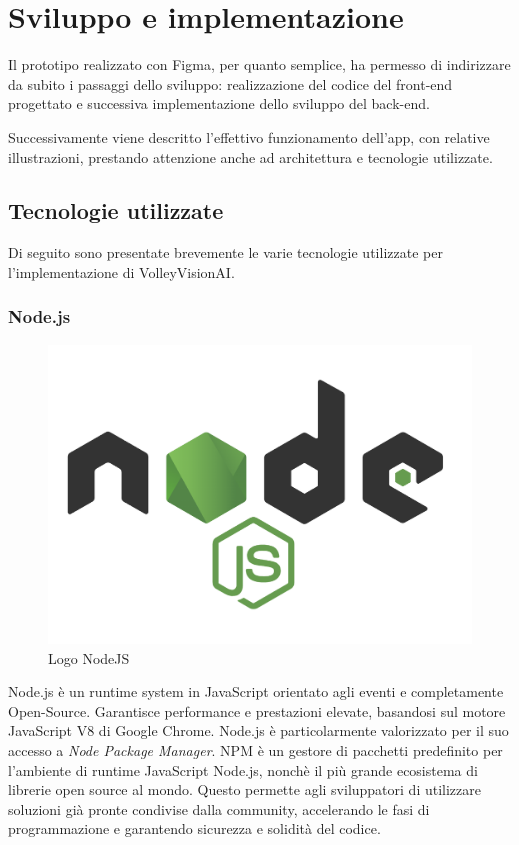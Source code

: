 \chapter{Sviluppo e implementazione}
\label{cha:sviluppo_implementazione}

Il prototipo realizzato con Figma, per quanto semplice, ha permesso di indirizzare da subito i passaggi dello sviluppo: realizzazione del codice del front-end progettato e successiva implementazione dello sviluppo del back-end.

Successivamente viene descritto l'effettivo funzionamento dell'app, con relative illustrazioni, prestando attenzione anche ad architettura e tecnologie utilizzate.

\section{Tecnologie utilizzate}
\label{sec:tecnologie}

Di seguito sono presentate brevemente le varie tecnologie utilizzate per l'implementazione di VolleyVisionAI.


\subsection{Node.js}
\begin{figure}
    \centering
    \includegraphics[scale=0.17]{img/nodejs.png}
    \caption{Logo NodeJS}
\end{figure}
    
Node.js è un runtime system in JavaScript orientato agli eventi e completamente Open-Source. Garantisce performance e prestazioni elevate, basandosi sul motore JavaScript V8 di Google Chrome. Node.js è particolarmente valorizzato per il suo accesso a \textit{Node Package Manager}. NPM è un gestore di pacchetti predefinito per l'ambiente di runtime JavaScript Node.js, nonchè il più grande ecosistema di librerie open source al mondo. Questo permette agli sviluppatori di utilizzare soluzioni già pronte condivise dalla community, accelerando le fasi di programmazione e garantendo sicurezza e solidità del codice.


